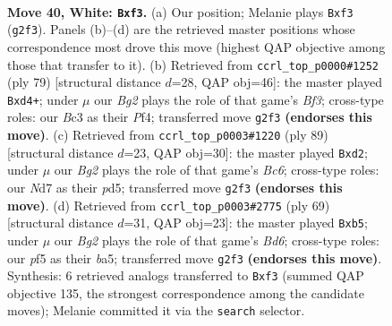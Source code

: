 \documentclass[11pt]{article}
\begin{document}
\clearpage

\begin{figure}[p]\centering
\begin{subfigure}{0.46\textwidth}\centering
\resizebox{\linewidth}{!}{%
\newchessgame
\chessboard[
  setfen={6k1/3N4/8/5p2/2ppbP2/1pB2n2/1P4B1/K7 w - - 0 40},
  showmover=false,
  pgfstyle=straightmove, color=movearrow, markmove={g2-f3}
]}
\caption{}
\end{subfigure}\hfill
\begin{subfigure}{0.46\textwidth}\centering
\resizebox{\linewidth}{!}{%
\newchessgame
\chessboard[
  setfen={8/5k2/5b1p/2B3p1/3Nbp2/5PP1/7P/6K1 b - - 0 40},
  showmover=false,
  pgfstyle=straightmove, color=movearrow, markmove={f6-d4}
]}
\caption{}
\end{subfigure}
\\[4pt]
\begin{subfigure}{0.46\textwidth}\centering
\resizebox{\linewidth}{!}{%
\newchessgame
\chessboard[
  setfen={8/8/6kp/2pP1p2/2P2P2/2bb3P/3N1K2/4B3 b - - 2 45},
  showmover=false,
  pgfstyle=straightmove, color=movearrow, markmove={c3-d2}
]}
\caption{}
\end{subfigure}\hfill
\begin{subfigure}{0.46\textwidth}\centering
\resizebox{\linewidth}{!}{%
\newchessgame
\chessboard[
  setfen={8/2p1k1p1/2B4p/BNn5/5PP1/P2b3P/1b6/3K4 b - - 0 35},
  showmover=false,
  pgfstyle=straightmove, color=movearrow, markmove={d3-b5}
]}
\caption{}
\end{subfigure}
\caption{\textbf{Move 40, White: \texttt{Bxf3}.} (a) Our position; Melanie plays \texttt{Bxf3} (\texttt{g2f3}). Panels (b)--(d) are the retrieved master positions whose correspondence most drove this move (highest QAP objective among those that transfer to it). (b) Retrieved from \texttt{ccrl\_top\_p0000\#1252} (ply 79) [structural distance $d$=28, QAP obj=46]: the master played \texttt{Bxd4+}; under $\mu$ our \emph{Bg2} plays the role of that game's \emph{Bf3}; cross-type roles: our \emph{B}c3 as their \emph{P}f4; transferred move \texttt{g2f3} \textbf{(endorses this move)}. (c) Retrieved from \texttt{ccrl\_top\_p0003\#1220} (ply 89) [structural distance $d$=23, QAP obj=30]: the master played \texttt{Bxd2}; under $\mu$ our \emph{Bg2} plays the role of that game's \emph{Bc6}; cross-type roles: our \emph{N}d7 as their \emph{p}d5; transferred move \texttt{g2f3} \textbf{(endorses this move)}. (d) Retrieved from \texttt{ccrl\_top\_p0003\#2775} (ply 69) [structural distance $d$=31, QAP obj=23]: the master played \texttt{Bxb5}; under $\mu$ our \emph{Bg2} plays the role of that game's \emph{Bd6}; cross-type roles: our \emph{p}f5 as their \emph{b}a5; transferred move \texttt{g2f3} \textbf{(endorses this move)}. Synthesis: 6 retrieved analogs transferred to \texttt{Bxf3} (summed QAP objective 135, the strongest correspondence among the candidate moves); Melanie committed it via the \texttt{search} selector.}
\label{fig:thought-m78}
\end{figure}
\end{document}
